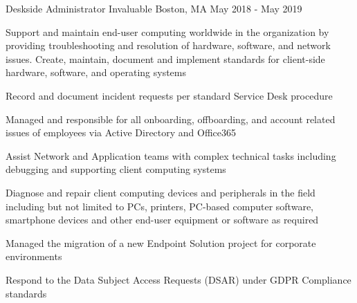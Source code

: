 \begin{cventries}
  \cventry
    {Deskside Administrator} %
    {Invaluable} %
    {Boston, MA} %
    {May 2018 - May 2019} %
    {
      \begin{cvitems} %
        \item {Support and maintain end-user computing worldwide in the organization by providing troubleshooting and
        resolution of hardware, software, and network issues. Create, maintain, document and implement standards for
        client-side hardware, software, and operating systems}
        \item {Record and document incident requests per standard Service Desk procedure}
        \item {Managed and responsible for all onboarding, offboarding, and account related issues of employees via Active
        Directory and Office365}
        \item {Assist Network and Application teams with complex technical tasks including debugging and supporting client
        computing systems}
        \item {Diagnose and repair client computing devices and peripherals in the field including but not limited to PCs,
        printers, PC-based computer software, smartphone devices and other end-user equipment or software as
        required}
        \item {Managed the migration of a new Endpoint Solution project for corporate environments}
        \item {Respond to the Data Subject Access Requests (DSAR) under GDPR Compliance standards}
      \end{cvitems}
    }


\end{cventries}
